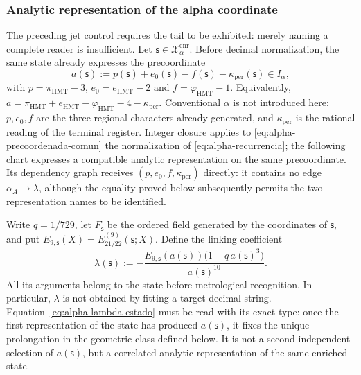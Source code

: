 \subsubsection{Analytic representation of the alpha coordinate}
\label{subsec:alpha-lector-completo-rev08}

The preceding jet control requires the tail to be exhibited: merely naming a
complete reader is insufficient. Let \(\mathsf s\in\mathcal X_\alpha^{\mathrm{enr}}\). Before
decimal normalization, the same state already expresses the precoordinate
\begin{equation}
 a(\mathsf s):=p(\mathsf s)+e_0(\mathsf s)-f(\mathsf s)
                 -\kappa_{\mathrm{per}}(\mathsf s)\in I_\alpha,
 \label{eq:alpha-precoordenada-comun}
\end{equation}
with \(p=\pi_{\mathrm{HMT}}-3\),
\(e_0=e_{\mathrm{HMT}}-2\) and
\(f=\varphi_{\mathrm{HMT}}-1\). Equivalently,
\(a=\pi_{\mathrm{HMT}}+e_{\mathrm{HMT}}-
\varphi_{\mathrm{HMT}}-4-\kappa_{\mathrm{per}}\). Conventional
\(\alpha\) is not introduced here: \(p,e_0,f\) are the three regional characters already
generated, and \(\kappa_{\mathrm{per}}\) is the rational reading of the terminal
register. Integer closure applies to
\eqref{eq:alpha-precoordenada-comun} the normalization of
\eqref{eq:alpha-recurrencia}; the following chart expresses a compatible analytic
representation on the same precoordinate. Its dependency graph
receives \((p,e_0,f,\kappa_{\mathrm{per}})\) directly: it contains no
edge \(\alpha_A\to\lambda\), although the equality proved below
subsequently permits the two representation names to be identified.

Write \(q=1/729\), let \(F_{\mathsf s}\) be the ordered field generated by
the coordinates of \(\mathsf s\), and put
\(E_{9,\mathsf s}(X)=E_{21/22}^{(9)}(\mathsf s;X)\). Define the linking
coefficient
\begin{equation}
 \lambda(\mathsf s):=
 -\frac{E_{9,\mathsf s}(a(\mathsf s))
         \bigl(1-q\,a(\mathsf s)^3\bigr)}{a(\mathsf s)^{10}}.
 \label{eq:alpha-lambda-estado}
\end{equation}
All its arguments belong to the state before metrological recognition.
In particular, \(\lambda\) is not obtained by fitting a target
decimal string. Equation~\eqref{eq:alpha-lambda-estado} must be read with
its exact type: once the first representation of the state has produced
\(a(\mathsf s)\), it fixes the unique prolongation in the geometric class
defined below. It is not a second independent selection of
\(a(\mathsf s)\), but a correlated analytic representation of the same
enriched state.


